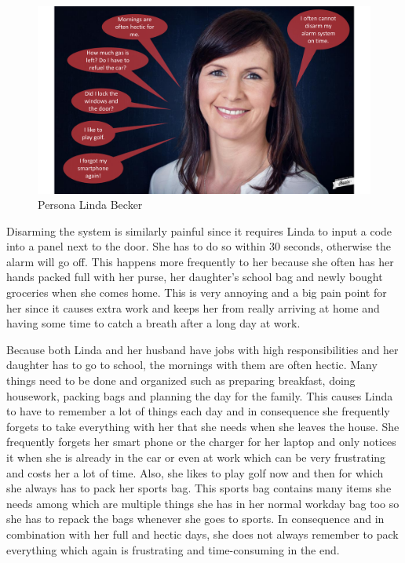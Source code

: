 \begin{figure}
\centering
\includegraphics[keepaspectratio, width=5.5in]{Figures/Needfinding/Persona_Linda}
	\caption{Persona Linda Becker\protect\footnotemark}
	\label{fig:persona}
\end{figure}


Disarming the system is similarly painful since it requires Linda to input a code into a panel next to the door. She has to do so within 30 seconds, otherwise the alarm will go off. This happens more frequently to her because she often has her hands packed full with her purse, her daughter's school bag and newly bought groceries when she comes home. This is very annoying and a big pain point for her since it causes extra work and keeps her from really arriving at home and having some time to catch a breath after a long day at work.

Because both Linda and her husband have jobs with high responsibilities and her daughter has to go to school, the mornings with them are often hectic. Many things need to be done and organized such as preparing breakfast, doing housework, packing bags and planning the day for the family. This causes Linda to have to remember a lot of things each day and in consequence she frequently forgets to take everything with her that she needs when she leaves the house. She frequently forgets her smart phone or the charger for her laptop and only notices it when she is already in the car or even at work which can be very frustrating and costs her a lot of time. Also, she likes to play golf now and then for which she always has to pack her sports bag. This sports bag contains many items she needs among which are multiple things she has in her normal workday bag too so she has to repack the bags whenever she goes to sports. In consequence and in combination with her full and hectic days, she does not always remember to pack everything which again is frustrating and time-consuming in the end.
